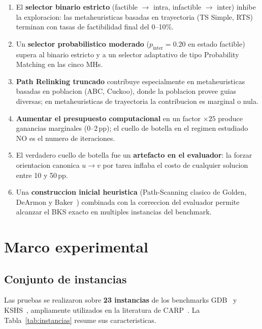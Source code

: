 \begin{enumerate}
\item El \textbf{selector binario estricto} (factible $\to$ intra,
  infactible $\to$ inter) inhibe la exploracion: las metaheuristicas
  basadas en trayectoria (TS Simple, RTS) terminan con tasas de
  factibilidad final del 0--10\%.
\item Un \textbf{selector probabilistico moderado} ($p_{\text{inter}}
  = 0.20$ en estado factible) supera al binario estricto y a un
  selector adaptativo de tipo Probability Matching en las cinco MHs.
\item \textbf{Path Relinking truncado} contribuye especialmente en
  metaheuristicas basadas en poblacion (ABC, Cuckoo), donde la
  poblacion provee guias diversas; en metaheuristicas de trayectoria
  la contribucion es marginal o nula.
\item \textbf{Aumentar el presupuesto computacional} en un factor
  $\times25$ produce ganancias marginales (0--2\,pp); el cuello de
  botella en el regimen estudiado NO es el numero de iteraciones.
\item El verdadero cuello de botella fue un \textbf{artefacto en el
  evaluador}: la forzar orientacion canonica $u \to v$ por tarea
  inflaba el costo de cualquier solucion entre 10 y 50\,pp.
\item Una \textbf{construccion inicial heuristica} (Path-Scanning
  clasico de Golden, DeArmon y Baker~\cite{golden1983}) combinada con la
  correccion del evaluador permite alcanzar el BKS exacto en multiples
  instancias del benchmark.
\end{enumerate}

\section{Marco experimental}
\label{sec:marco-experimental}

\subsection{Conjunto de instancias}
\label{sec:instancias}

Las pruebas se realizaron sobre \textbf{23 instancias} de los
benchmarks GDB~\cite{golden1983} y KSHS~\cite{kiuchi1995}, ampliamente
utilizados en la literatura de CARP~\cite{golden1981}. La
Tabla~\ref{tab:instancias} resume sus caracteristicas.

